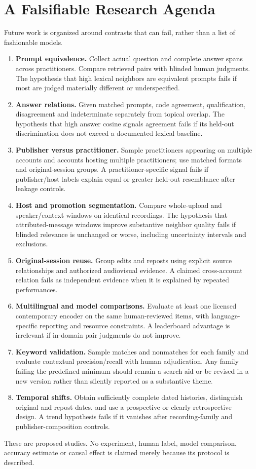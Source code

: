 \section{A Falsifiable Research Agenda}
Future work is organized around contrasts that can fail, rather than a list of fashionable models.
\begin{enumerate}
\item \textbf{Prompt equivalence.} Collect actual question and complete answer spans across practitioners. Compare retrieved pairs with blinded human judgments. The hypothesis that high lexical neighbors are equivalent prompts fails if most are judged materially different or underspecified.
\item \textbf{Answer relations.} Given matched prompts, code agreement, qualification, disagreement and indeterminate separately from topical overlap. The hypothesis that high answer cosine signals agreement fails if its held-out discrimination does not exceed a documented lexical baseline.
\item \textbf{Publisher versus practitioner.} Sample practitioners appearing on multiple accounts and accounts hosting multiple practitioners; use matched formats and original-session groups. A practitioner-specific signal fails if publisher/host labels explain equal or greater held-out resemblance after leakage controls.
\item \textbf{Host and promotion segmentation.} Compare whole-upload and speaker/context windows on identical recordings. The hypothesis that attributed-message windows improve substantive neighbor quality fails if blinded relevance is unchanged or worse, including uncertainty intervals and exclusions.
\item \textbf{Original-session reuse.} Group edits and reposts using explicit source relationships and authorized audiovisual evidence. A claimed cross-account relation fails as independent evidence when it is explained by repeated performances.
\item \textbf{Multilingual and model comparisons.} Evaluate at least one licensed contemporary encoder on the same human-reviewed items, with language-specific reporting and resource constraints. A leaderboard advantage is irrelevant if in-domain pair judgments do not improve.
\item \textbf{Keyword validation.} Sample matches and nonmatches for each family and evaluate contextual precision/recall with human adjudication. Any family failing the predefined minimum should remain a search aid or be revised in a new version rather than silently reported as a substantive theme.
\item \textbf{Temporal shifts.} Obtain sufficiently complete dated histories, distinguish original and repost dates, and use a prospective or clearly retrospective design. A trend hypothesis fails if it vanishes after recording-family and publisher-composition controls.
\end{enumerate}
These are proposed studies. No experiment, human label, model comparison, accuracy estimate or causal effect is claimed merely because its protocol is described.

